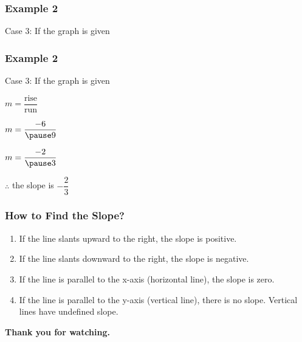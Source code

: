 \documentclass[14pt]{beamer}
\begin{document}
    \begin{frame}
    	\frametitle{Example 2}
    	Case 3: If the graph is given
    	
    \end{frame}
    
    \begin{frame}
    	\frametitle{Example 2}
    	Case 3: If the graph is given
    	
    	\vone $ m = \dfrac{\text{rise}}{\text{run}} $
    	
    	\pause \vone $ m = \dfrac{-6}{\pause 9} $
    	
    	\pause \vone $ m = \dfrac{-2}{\pause 3} $
    	
    	\pause \vone $ \therefore $ the slope is $ -\dfrac{2}{3} $
    \end{frame}

    \begin{frame}
    	\frametitle{How to Find the Slope?}
    	\begin{enumerate}
    		\item If the line slants upward to the right, the slope is positive.
    		\item \pause  If the line slants downward to the right, the slope is negative.
    		\item  \pause If the line is parallel to the x-axis (horizontal line), the slope is zero.
    		\item  \pause If the line is parallel to the y-axis (vertical line), there is no slope. Vertical lines have undefined slope.
    	\end{enumerate}
    	
    \end{frame}

    \begin{frame}
    	\begin{center}
    		\textbf{\LARGE Thank you for watching.}
    	\end{center}
    \end{frame}
	
\end{document}
